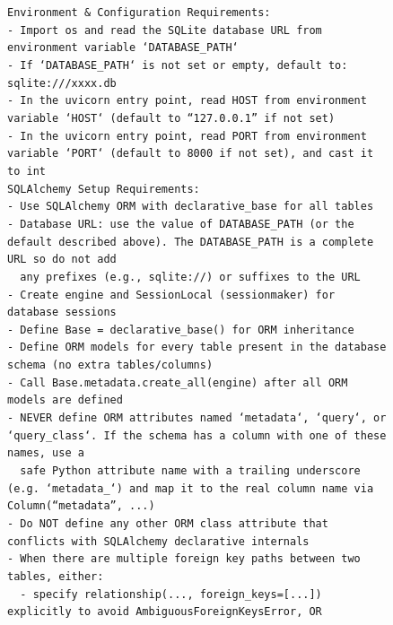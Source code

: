 \begin{figure}[p]
{\begin{minipage}{0.97\textwidth}
        \texttt{Environment \& Configuration Requirements:}\\
        \texttt{- Import os and read the SQLite database URL from environment variable `DATABASE\_PATH`}\\
        \texttt{- If `DATABASE\_PATH` is not set or empty, default to: sqlite:///xxxx.db}\\
        \texttt{- In the uvicorn entry point, read HOST from environment variable `HOST` (default to ``127.0.0.1'' if not set)}\\
        \texttt{- In the uvicorn entry point, read PORT from environment variable `PORT` (default to 8000 if not set), and cast it to int}\\[3pt]

        \texttt{SQLAlchemy Setup Requirements:}\\
        \texttt{- Use SQLAlchemy ORM with declarative\_base for all tables}\\
        \texttt{- Database URL: use the value of DATABASE\_PATH (or the default described above). The DATABASE\_PATH is a complete URL so do not add}\\
        \texttt{~~any prefixes (e.g., sqlite://) or suffixes to the URL}\\
        \texttt{- Create engine and SessionLocal (sessionmaker) for database sessions}\\
        \texttt{- Define Base = declarative\_base() for ORM inheritance}\\
        \texttt{- Define ORM models for every table present in the database schema (no extra tables/columns)}\\
        \texttt{- Call Base.metadata.create\_all(engine) after all ORM models are defined}\\
        \texttt{- NEVER define ORM attributes named `metadata`, `query`, or `query\_class`. If the schema has a column with one of these names, use a}\\
        \texttt{~~safe Python attribute name with a trailing underscore (e.g. `metadata\_`) and map it to the real column name via Column(``metadata'', ...)}\\
        \texttt{- Do NOT define any other ORM class attribute that conflicts with SQLAlchemy declarative internals}\\
        \texttt{- When there are multiple foreign key paths between two tables, either:}\\
        \texttt{~~- specify relationship(..., foreign\_keys=[...]) explicitly to avoid AmbiguousForeignKeysError, OR}\\

\end{minipage}}
\end{figure}

